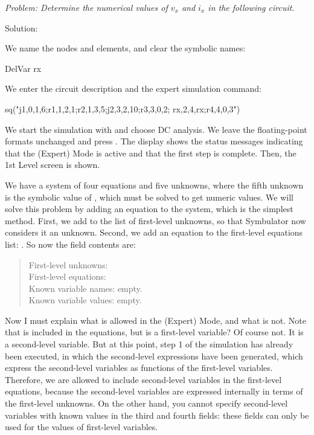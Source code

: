 
\emph{Problem: Determine the numerical values of $v_x$ and $i_x$ in
the following circuit.}

Solution:

We name the nodes and elements, and clear the symbolic names:

\begin{entry}
DelVar rx
\end{entry}

We enter the circuit description and the expert simulation command:

\begin{entry}
sq\expert("j1,0,1,6;r1,1,2,1;r2,1,3,5;j2,3,2,10;r3,3,0,2;
          rx,2,4,rx;r4,4,0,3")
\end{entry}

We start the simulation with  and choose DC analysis. We
leave the floating-point formats unchanged and press .
The display shows the status messages indicating that the (Expert)
Mode is active and that the first step is complete. Then, the 1st
Level screen is shown.

We have a system of four equations and five unknowns, where the
fifth unknown is the symbolic value of , which must be
solved to get numeric values. We will solve this problem by adding
an equation to the system, which is the simplest method. First, we
add  to the list of first-level unknowns, so that
Symbulator now considers it an unknown. Second, we add an equation
to the first-level equations list: . So now the
field contents are:

\begin{quote}
First-level unknowns: \\
First-level equations: \\
Known variable names: empty.\\
Known variable values: empty.
\end{quote}

Now I must explain what is allowed in the (Expert) Mode, and what is
not. Note that  is included in the equations, but is
 a first-level variable? Of course not. It is a
second-level variable. But at this point, step 1 of the simulation
has already been executed, in which the second-level expressions
have been generated, which express the second-level variables as
functions of the first-level variables. Therefore, we are allowed to
include second-level variables in the first-level equations, because
the second-level variables are expressed internally in terms of the
first-level unknowns. On the other hand, you cannot specify
second-level variables with known values in the third and fourth
fields: these fields can only be used for the values of first-level
variables.

